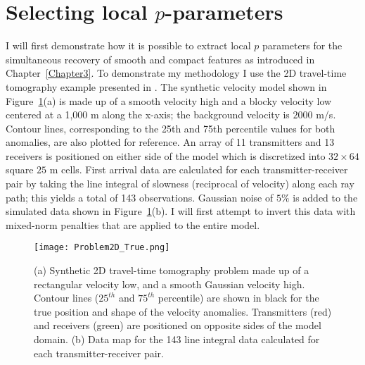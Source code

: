 \section{Selecting local $p$-parameters}
I will first demonstrate how it is possible to extract local $p$ parameters for the simultaneous recovery of smooth and compact features as introduced in Chapter~\ref{Chapter3}.
To demonstrate my methodology I use the 2D travel-time tomography example presented in \citet{SunLi14}. The synthetic velocity model shown in Figure~\ref{Problem2DTrue}(a) is made up of a smooth velocity high and a blocky velocity low centered at a 1,000 m along the x-axis; the background velocity is $2000$ m/s. Contour lines, corresponding to the 25th and 75th percentile values for both anomalies, are also plotted for reference. An array of 11 transmitters and 13 receivers is positioned on either side of the model which is discretized into $32 \times 64$ square $25$ m cells.
First arrival data are calculated for each transmitter-receiver pair by taking the line integral of slowness (reciprocal of velocity) along each ray path; this yields a total of 143 observations.
Gaussian noise of $5\%$ is added to the simulated data shown in Figure~\ref{Problem2DTrue}(b).
I will first attempt to invert this data with mixed-norm penalties that are applied to the entire model.
\begin{figure}
\texttt{[image: Problem2D\_True.png]}
\caption{(a) Synthetic 2D travel-time tomography problem made up of a rectangular velocity low, and a smooth Gaussian velocity high. Contour lines ($25^{th}$ and $75^{th}$ percentile) are shown in black for the true position and shape of the velocity anomalies. Transmitters (red) and receivers (green) are positioned on opposite sides of the model domain. (b) Data map for the 143 line integral data calculated for each transmitter-receiver pair.
}
\label{Problem2DTrue}
\end{figure}

